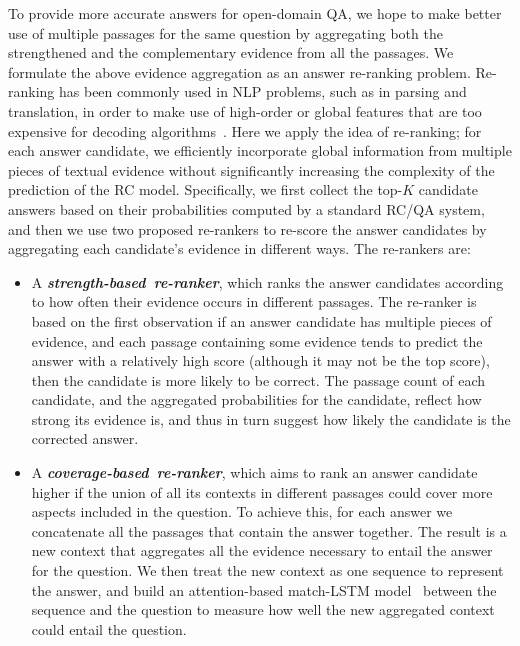 \documentclass{article} \usepackage{iclr2018_conference,times}
\def \coherence {strength-based}
\def \union {coverage-based}
\begin{document}
To provide more accurate answers for open-domain QA, we hope to make better use of multiple passages for the same question by aggregating both the strengthened 
and the complementary evidence from all the passages.
We formulate the above evidence aggregation as an answer re-ranking problem.
Re-ranking has been commonly used in NLP problems, such as in parsing and translation, in order to make use of high-order or global features that are too expensive for decoding algorithms~\citep{collins2005discriminative,shen2004discriminative,huang2008forest,dyer2016recurrent}. Here we apply the idea of re-ranking; for each answer candidate, we efficiently incorporate global information from multiple pieces of textual evidence without significantly increasing the complexity of the prediction of the RC model.
Specifically, we first collect the top-$K$ candidate answers based on their probabilities computed by a standard RC/QA system, and then we use two proposed re-rankers to re-score the answer candidates by aggregating each candidate's evidence in different ways. The re-rankers are:
\begin{itemize}[labelindent=0.5em,labelsep=0.2cm,leftmargin=0.5cm]
\item A \textbf{\emph{\coherence\ re-ranker}}, which ranks the answer candidates according to how often their evidence occurs in different passages. 
The re-ranker is based on the first observation if an answer candidate has multiple pieces of evidence, and each passage containing some evidence tends to predict the answer with a relatively high score (although it may not be the top score), then the candidate is more likely to be correct. The passage count of each candidate, and the aggregated probabilities for the candidate, reflect how strong its evidence is, and thus in turn suggest how likely the candidate is the corrected answer.
\item A \textbf{\emph{\union\ re-ranker}}, which aims to rank an answer candidate higher if the union of all its contexts in different passages could cover more aspects included in the question. To achieve this, for each answer we concatenate all the passages that contain the answer together. The result is a new context that aggregates all the evidence necessary to entail the answer for the question.
We then treat the new context as one sequence to represent the answer, and build an attention-based match-LSTM model~\citep{wang2016machine} between the sequence and the question to measure how well the new aggregated context could entail the question.
\end{itemize}
\end{document}
